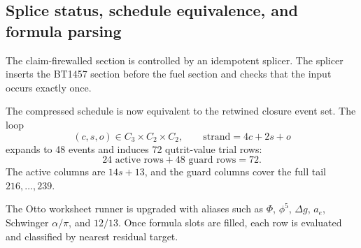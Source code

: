 \subsection{Splice status, schedule equivalence, and formula parsing}
\label{sec:bt1462-bt1464-splice-equivalence-parser}

The claim-firewalled section is controlled by an idempotent splicer.  The
splicer inserts the BT1457 section before the fuel section and checks that the
input occurs exactly once.

The compressed schedule is now equivalent to the retwined closure event set.  The
loop
\[
(c,s,o)\in C_3\times C_2\times C_2,
\qquad
\mathrm{strand}=4c+2s+o
\]
expands to 48 events and induces 72 qutrit-value trial rows:
\[
24\text{ active rows}+48\text{ guard rows}=72.
\]
The active columns are \(14s+13\), and the guard columns cover the full tail
\(216,\ldots,239\).

The Otto worksheet runner is upgraded with aliases such as \(\Phi\), \(\phi^5\),
\(\Delta g\), \(a_e\), Schwinger \(\alpha/\pi\), and \(12/13\).  Once formula
slots are filled, each row is evaluated and classified by nearest residual target.
